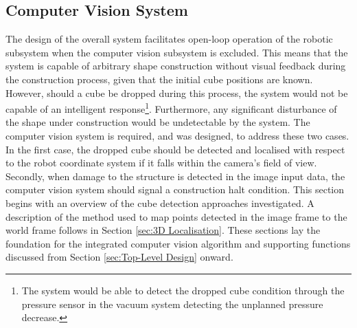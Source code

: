 
\subsection{Computer Vision System} \label{sec:Computer Vision System}

The design of the overall system facilitates open-loop operation of the robotic subsystem when the computer vision subsystem is excluded. This means that the system is capable of arbitrary shape construction without visual feedback during the construction process, given that the initial cube positions are known. However, should a cube be dropped during this process, the system would not be capable of an intelligent response\footnote{The system would be able to detect the dropped cube condition through the pressure sensor in the vacuum system detecting the unplanned pressure decrease.}. Furthermore, any significant disturbance of the shape under construction would be undetectable by the system. The computer vision system is required, and was designed, to address these two cases. In the first case, the dropped cube should be detected and localised with respect to the robot coordinate system if it falls within the camera's field of view. Secondly, when damage to the structure is detected in the image input data, the computer vision system should signal a construction halt condition. This section begins with an overview of the cube detection approaches investigated. A description of the method used to map points detected in the image frame to the world frame follows in Section \ref{sec:3D Localisation}. These sections lay the foundation for the integrated computer vision algorithm and supporting functions discussed from Section \ref{sec:Top-Level Design} onward.

